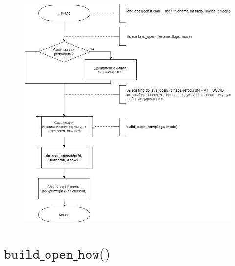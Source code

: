 \documentclass[a4paper,14pt]{extreport}
\begin{document}
\begin{figure}[H]
	\centering
	\includegraphics[scale=0.4]{img/open1.jpg}
\end{figure}





\section{$\texttt{build\_open\_how()}$}
\end{document}
